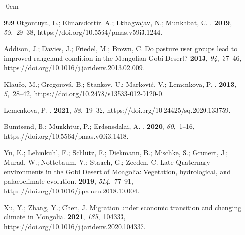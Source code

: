 \documentclass[geosciences,article,accept,pdftex,oneauthor]{Definitions/mdpi}
\begin{document}
\begin{adjustwidth}{-\extralength}{0cm}
\begin{thebibliography}{999}
Otgontuya, L.; Elmarsdottir, A.; Lkhagvajav, N.; Munkhbat, C.
.
 {\bf 2019},
  {\em 59},~29--38, https://doi.org/10.5564/pmas.v59i3.1244.

Addison, J.; Davies, J.; Friedel, M.; Brown, C.
\newblock Do pasture user groups lead to improved rangeland condition in the
  Mongolian Gobi Desert?
 {\bf 2013}, {\em 94},~37--46, https://doi.org/10.1016/j.jaridenv.2013.02.009.

Klaučo, M.; Gregorová, B.; Stankov, U.; Marković, V.; Lemenkova, P.
.
 {\bf 2013}, {\em 5},~28--42, https://doi.org/10.2478/s13533-012-0120-0.

Lemenkova, P.
.
 {\bf 2021}, {\em 38},~19--32, https://doi.org/10.24425/sq.2020.133759.

Bumtsend, B.; Munkhtur, P.; Erdenedalai, A.
.
 {\bf 2020},
  {\em 60},~1--16, https://doi.org/10.5564/pmas.v60i3.1418.

Yu, K.; Lehmkuhl, F.; Schlütz, F.; Diekmann, B.; Mischke, S.; Grunert, J.;
  Murad, W.; Nottebaum, V.; Stauch, G.; Zeeden, C.
\newblock Late Quaternary environments in the Gobi Desert of Mongolia:
  Vegetation, hydrological, and palaeoclimate evolution.
 {\bf 2019},
  {\em 514},~77--91, https://doi.org/10.1016/j.palaeo.2018.10.004.

Xu, Y.; Zhang, Y.; Chen, J.
\newblock Migration under economic transition and changing climate in Mongolia.
 {\bf 2021}, {\em 185},~104333, https://doi.org/10.1016/j.jaridenv.2020.104333.


\end{thebibliography}
\end{adjustwidth}
\end{document}
